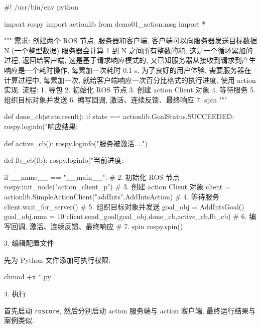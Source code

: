 \documentclass[openany, fontset=windowsold]{ctexbook}
\theoremstyle{kaiti}
\theoremstyle{normal}
\begin{document}
\begin{python}
  #! /usr/bin/env python

  import rospy
  import actionlib
  from demo01_action.msg import *

  """
      需求:
          创建两个 ROS 节点, 服务器和客户端, 
          客户端可以向服务器发送目标数据 N (一个整型数据) 服务器会计算 1 到 N 之间所有整数的和,
          这是一个循环累加的过程, 返回给客户端, 这是基于请求响应模式的, 
          又已知服务器从接收到请求到产生响应是一个耗时操作, 每累加一次耗时 0.1 s, 
          为了良好的用户体验, 需要服务器在计算过程中, 
          每累加一次, 就给客户端响应一次百分比格式的执行进度, 使用 action实现.
      流程:
          1. 导包
          2. 初始化 ROS 节点
          3. 创建 action Client 对象
          4. 等待服务
          5. 组织目标对象并发送
          6. 编写回调, 激活、连续反馈、最终响应
          7. spin
  """

  def done_cb(state,result):
      if state == actionlib.GoalStatus.SUCCEEDED:
          rospy.loginfo("响应结果:%

  def active_cb():
      rospy.loginfo("服务被激活....")

  def fb_cb(fb):
      rospy.loginfo("当前进度:%

  if __name__ == "__main__":
      # 2. 初始化 ROS 节点
      rospy.init_node("action_client_p")
      # 3. 创建 action Client 对象
      client = actionlib.SimpleActionClient("addInts",AddIntsAction)
      # 4. 等待服务
      client.wait_for_server()
      # 5. 组织目标对象并发送
      goal_obj = AddIntsGoal()
      goal_obj.num = 10
      client.send_goal(goal_obj,done_cb,active_cb,fb_cb)
      # 6. 编写回调, 激活、连续反馈、最终响应
      # 7. spin
      rospy.spin()
\end{python}

3. 编辑配置文件

先为 Python 文件添加可执行权限:

\begin{bash}
  chmod +x *.py
\end{bash}


4. 执行

首先启动 \verb|roscore|, 然后分别启动 action 服务端与 action 客户端, 最终运行结果与案例类似.
\end{document}
